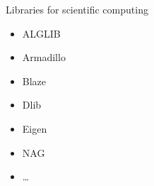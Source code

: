 \begin{frame}{Libraries for scientific computing}
    \begin{itemize}
        \item ALGLIB
        \item Armadillo
        \item Blaze
        \item Dlib
        \item Eigen
        \item NAG
        \item \ldots
    \end{itemize}
\end{frame}



